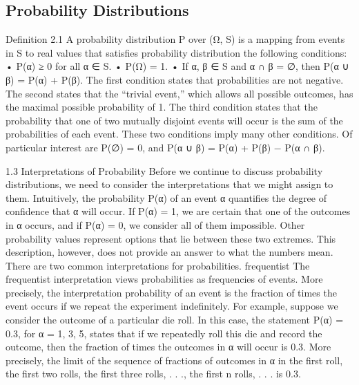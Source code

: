 \subsection{Probability Distributions}

Definition 2.1 A probability distribution P over (Ω, S) is a mapping from events in S to real values that satisfies probability distribution the following conditions: • P(α) ≥ 0 for all α ∈ S. • P(Ω) = 1. • If α, β ∈ S and α ∩ β = ∅, then P(α ∪ β) = P(α) + P(β). The first condition states that probabilities are not negative. The second states that the “trivial event,” which allows all possible outcomes, has the maximal possible probability of 1. The third condition states that the probability that one of two mutually disjoint events will occur is the sum of the probabilities of each event. These two conditions imply many other conditions. Of particular interest are P(∅) = 0, and P(α ∪ β) = P(α) + P(β) − P(α ∩ β).

1.3 Interpretations of Probability
Before we continue to discuss probability distributions, we need to consider the interpretations that we might assign to them. Intuitively, the probability P(α) of an event α quantifies the degree of confidence that α will occur. If P(α) = 1, we are certain that one of the outcomes in α occurs, and if P(α) = 0, we consider all of them impossible. Other probability values represent options that lie between these two extremes. This description, however, does not provide an answer to what the numbers mean. There are two common interpretations for probabilities. frequentist The frequentist interpretation views probabilities as frequencies of events. More precisely, the interpretation probability of an event is the fraction of times the event occurs if we repeat the experiment indefinitely. For example, suppose we consider the outcome of a particular die roll. In this case, the statement P(α) = 0.3, for α = {1, 3, 5}, states that if we repeatedly roll this die and record the outcome, then the fraction of times the outcomes in α will occur is 0.3. More precisely, the limit of the sequence of fractions of outcomes in α in the first roll, the first two rolls, the first three rolls, . . ., the first n rolls, . . . is 0.3.

